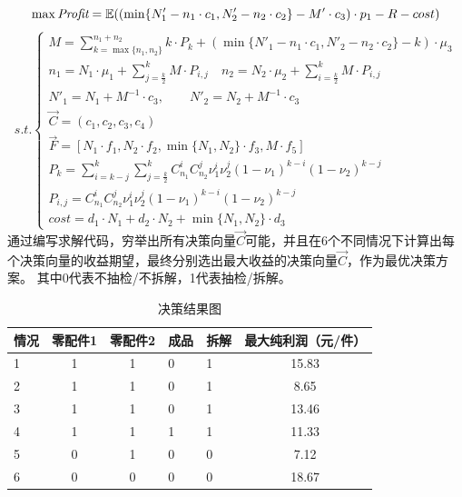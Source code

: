 \documentclass[withoutpreface,bwprint]{cumcmthesis} %
\begin{document}
$$	\max \textit{Profit}=\mathbb{E}((\min \{N'_{1}-n_{1}\cdot c_{1},N'_{2}-n_{2}\cdot c_{2}\}-M'\cdot c_{3})\cdot p_{1}-R-cost )\\$$
\begin{equation*}
	s.t.\begin{cases}
		M=\sum_{k=\max \{n_{1},n_{2}\}}^{n_{1}+n_{2}}k\cdot P_{k} + (\min \{N'_{1}-n_{1}\cdot c_{1},N'_{2}-n_{2}\cdot c_{2}\}-k)\cdot \mu_{3}                              \\
		n_{1}=N_{1}\cdot \mu_{1}+\sum_{j=\frac{k}{2}}^{k}M\cdot P_{i,j} \quad n_{2}=N_{2}\cdot \mu_{2}+\sum_{i=\frac{k}{2}}^{k}M\cdot P_{i,j}                                                    \\
		N'_{1}=N_{1}+M^{-1}\cdot c_{3} ,\qquad N'_{2}=N_{2}+M^{-1}\cdot c_{3}                                                                                                                                             \\
		\vec{C}=(c_{1},c_{2},c_{3},c_{4})                                                                                                                                                 \\
		\vec{F}=[N_{1}\cdot f_{1},N_{2}\cdot f_{2},\min \{N_{1},N_{2}\}\cdot f_{3},M\cdot f_{5}]                                                                                         \\
		P_{k}=\sum_{i=k-j}^{k}\sum_{j=\frac{k}{2}}^{k}C_{n_{1}}^{i}C_{n_{2}}^{j}\nu_{1}^{i}\nu_{2}^{j}(1-\nu_{1})^{k-i}(1-\nu_{2})^{k-j}                               \\
		P_{i,j}=C_{n_{1}}^{i}C_{n_{2}}^{j}\nu_{1}^{i}\nu_{2}^{j}(1-\nu_{1})^{k-i}(1-\nu_{2})^{k-j}     \\
		cost=d_{1}\cdot N_{1}+d_{2}\cdot N_{2}+\min \{ N_{1},N_{2}\}\cdot d_{3}
	\end{cases}
\end{equation*}
通过编写求解代码，穷举出所有决策向量$\vec{C}$可能，并且在6个不同情况下计算出每个决策向量的收益期望，最终分别选出最大收益的决策向量$\vec{C}$，作为最优决策方案。
其中0代表不抽检/不拆解，1代表抽检/拆解。
\begin{longtable}{m{1.5cm}<{\centering}ccm{1.5cm}<{\centering}m{1.5cm}<{\centering}c}
	\caption{决策结果图}
	\label{tab:my-table}                    \\
	\hline
	情况 & 零配件1 & 零配件2 & 成品 & 拆解 & 最大纯利润（元/件） \\ \hline
	\endfirsthead
	\endhead
	\hline
	\endfoot
	\endlastfoot
	1  & 1    & 1    & 0  & 1  & 15.83      \\
	2  & 1    & 1    & 0  & 1  & 8.65       \\
	3  & 1    & 1    & 0  & 1  & 13.46      \\
	4  & 1    & 1    & 1  & 1  & 11.33      \\
	5  & 0    & 1    & 0  & 0  & 7.12      \\
	6  & 0    & 0    & 0  & 0  & 18.67     \\ \hline
\end{longtable}
\end{document}
